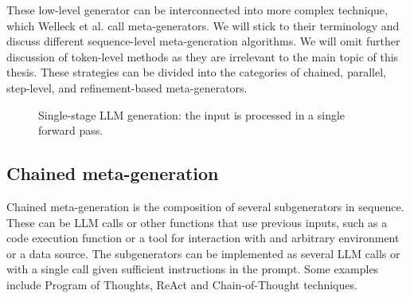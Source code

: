 These low-level generator can be interconnected into more complex technique, which Welleck et al. call meta-generators\cite{welleck2024decodingmetagenerationinferencetimealgorithms}.
We will stick to their terminology and discuss different sequence-level meta-generation algorithms. We will omit further discussion of token-level methods as
they are irrelevant to the main topic of this thesis. These strategies can be divided into the categories of chained, parallel, step-level, and refinement-based meta-generators.
\begin{figure}[ht]
    \centering
    \caption{Single-stage LLM generation: the input is processed in a single forward pass.}
    \label{fig:single_stage}
\end{figure}

\subsection{Chained meta-generation}

Chained meta-generation is the composition of several subgenerators in sequence. 
These can be LLM calls or other functions that use previous inputs, such as a code execution function\cite{chen2023programthoughtspromptingdisentangling}
or a tool for interaction with and arbitrary environment or a data source\cite{yao2023reactsynergizingreasoningacting}.
The subgenerators can be implemented as several LLM calls or with a single call given sufficient instructions in the prompt. \cite{khattab2023dspycompilingdeclarativelanguage}
Some examples include Program of Thoughts\cite{chen2023programthoughtspromptingdisentangling}, ReAct\cite{yao2023reactsynergizingreasoningacting} 
and Chain-of-Thought\cite{NEURIPS2022_8bb0d291}\cite{wei2023chainofthoughtpromptingelicitsreasoning} techniques.

